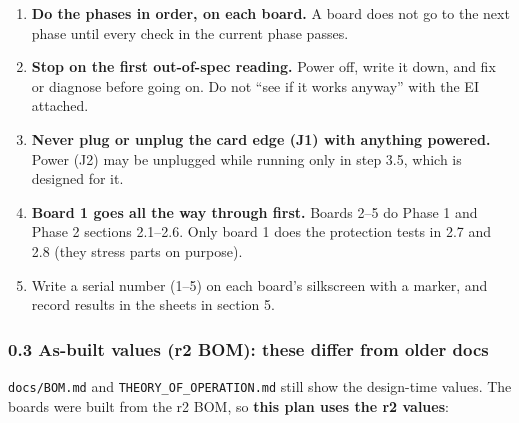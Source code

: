 \documentclass[
  10pt,
]{article}
\providecommand{\tightlist}{%
  \setlength{\itemsep}{0pt}\setlength{\parskip}{0pt}}
\begin{document}
\begin{enumerate}
\def\labelenumi{\arabic{enumi}.}
\tightlist
\item
  \textbf{Do the phases in order, on each board.} A board
  does not go to the next phase until every check in the
  current phase passes.
\item
  \textbf{Stop on the first out-of-spec reading.} Power off,
  write it down, and fix or diagnose before going on. Do not
  ``see if it works anyway'' with the EI attached.
\item
  \textbf{Never plug or unplug the card edge (J1) with
  anything powered.} Power (J2) may be unplugged while
  running only in step 3.5, which is designed for it.
\item
  \textbf{Board 1 goes all the way through first.} Boards
  2--5 do Phase 1 and Phase 2 sections 2.1--2.6. Only board
  1 does the protection tests in 2.7 and 2.8 (they stress
  parts on purpose).
\item
  Write a serial number (1--5) on each board's silkscreen
  with a marker, and record results in the sheets in section
  5.
\end{enumerate}

\hypertarget{as-built-values-r2-bom-these-differ-from-older-docs}{%
\subsubsection{0.3 As-built values (r2 BOM): these differ
from older
docs}\label{as-built-values-r2-bom-these-differ-from-older-docs}}

\texttt{docs/BOM.md} and \texttt{THEORY\_OF\_OPERATION.md}
still show the design-time values. The boards were built
from the r2 BOM, so \textbf{this plan uses the r2 values}:
\end{document}
